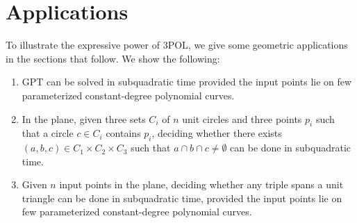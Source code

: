 \section{Applications}\label{sec:applications}

To illustrate the expressive power of 3POL, we give some geometric
applications in the sections that follow. We show the following:
\begin{enumerate}
\setlength{\itemsep}{0pt}
\setlength{\parskip}{0pt}
\setlength{\parsep}{0pt}
\item GPT can be solved in subquadratic time provided the input points
lie on few parameterized constant-degree polynomial curves.
\item In the plane, given three sets $C_i$ of $n$ unit circles and three points
$p_i$ such that a circle $c \in C_i$ contains $p_i$, deciding whether there
exists $(a,b,c) \in C_1 \times C_2 \times C_3$ such that $a \cap b \cap c
\neq \emptyset$ can be done in subquadratic time.
\item Given $n$ input points in the plane, deciding whether any triple spans a unit
triangle can be done in subquadratic time, provided the input points lie on few
parameterized constant-degree polynomial curves.
\end{enumerate}
